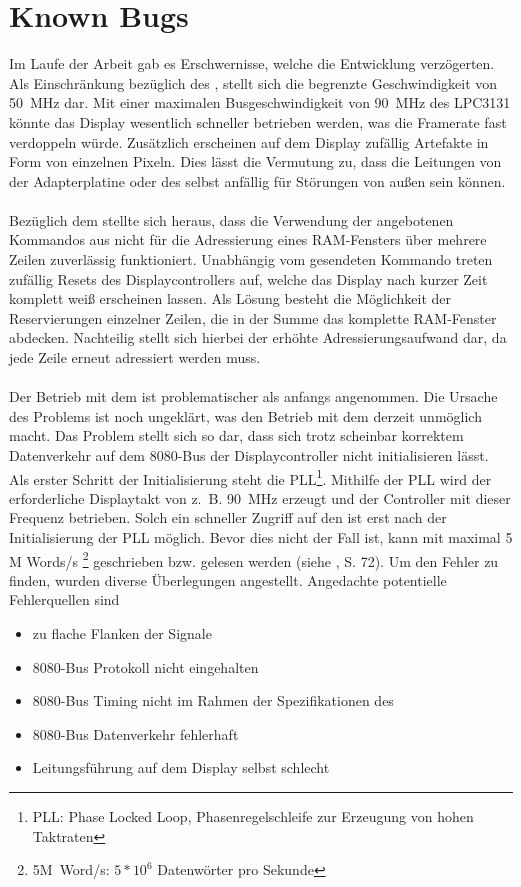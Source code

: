 \section{Known Bugs}
\label{teila_knownbugs}
Im Laufe der Arbeit gab es Erschwernisse, welche die Entwicklung verzögerten. 
Als Einschränkung bezüglich des , stellt sich die begrenzte Geschwindigkeit von 50~MHz dar. Mit einer maximalen Busgeschwindigkeit von 90~MHz des LPC3131 könnte das Display wesentlich schneller betrieben werden, was die Framerate fast verdoppeln würde. Zusätzlich erscheinen auf dem Display zufällig Artefakte in Form von einzelnen Pixeln. Dies lässt die Vermutung zu, dass die Leitungen von der Adapterplatine oder des  selbst anfällig für Störungen von außen sein können. \\ \\
Bezüglich dem  stellte sich heraus, dass die Verwendung der angebotenen Kommandos aus  nicht für die Adressierung eines RAM-Fensters über mehrere Zeilen zuverlässig funktioniert. Unabhängig vom gesendeten Kommando treten zufällig Resets des Displaycontrollers auf, welche das Display nach kurzer Zeit komplett weiß erscheinen lassen. Als Lösung besteht die Möglichkeit der Reservierungen einzelner Zeilen, die in der Summe das komplette RAM-Fenster abdecken. Nachteilig stellt sich hierbei der erhöhte Adressierungsaufwand dar, da jede Zeile erneut adressiert werden muss.\\ \\
Der Betrieb mit dem  ist problematischer als anfangs angenommen. Die Ursache des Problems ist noch ungeklärt, was den Betrieb mit dem  derzeit unmöglich macht.
Das Problem stellt sich so dar, dass sich trotz scheinbar korrektem Datenverkehr auf dem 8080-Bus der Displaycontroller nicht initialisieren lässt. Als erster Schritt der Initialisierung steht die PLL\footnote{PLL: Phase Locked Loop, Phasenregelschleife zur Erzeugung von hohen Taktraten}. Mithilfe der PLL wird der erforderliche Displaytakt von z.~B. 90~MHz erzeugt und der Controller mit dieser Frequenz betrieben. Solch ein schneller Zugriff auf den  ist erst nach der Initialisierung der PLL möglich. Bevor dies nicht der Fall ist, kann mit maximal 5 M Words/s \footnote{5M~Word/s: $5*10^6$ Datenwörter pro Sekunde} geschrieben bzw. gelesen werden (siehe \cite{SSD2008}, S. 72). Um den Fehler zu finden, wurden diverse Überlegungen angestellt. Angedachte potentielle Fehlerquellen sind
\begin{itemize}
\item zu flache Flanken der Signale
\item 8080-Bus Protokoll nicht eingehalten
\item 8080-Bus Timing nicht im Rahmen der Spezifikationen des 
\item 8080-Bus Datenverkehr fehlerhaft
\item Leitungsführung auf dem Display selbst schlecht
\end{itemize}
